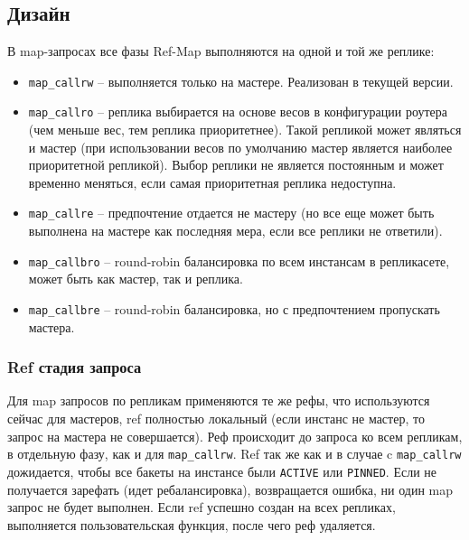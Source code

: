\subsection{Дизайн}

В map-запросах все фазы Ref-Map выполняются на одной и той же реплике:

\begin{itemize}
\item \texttt{map_callrw} -- выполняется только на мастере. Реализован в
    текущей версии.

\item \texttt{map\_callro} -- реплика выбирается на основе весов в конфигурации
    роутера (чем меньше вес, тем реплика приоритетнее). Такой репликой может
        являться и мастер (при использовании весов по умолчанию мастер является
        наиболее приоритетной репликой). Выбор реплики не является постоянным и
        может временно меняться, если самая приоритетная реплика недоступна.

\item \texttt{map\_callre} -- предпочтение отдается не мастеру (но все еще
    может быть выполнена на мастере как последняя мера, если все реплики не
        ответили).

\item \texttt{map\_callbro} -- round-robin балансировка по всем инстансам в
    репликасете, может быть как мастер, так и реплика.

\item \texttt{map\_callbre} -- round-robin балансировка, но с предпочтением
    пропускать мастера.
\end{itemize}

\subsubsection{Ref стадия запроса}

Для map запросов по репликам применяются те же рефы, что используются сейчас
для мастеров, ref полностью локальный (если инстанс не мастер, то запрос на
мастера не совершается). Реф происходит до запроса ко всем репликам, в
отдельную фазу, как и для \texttt{map\_callrw}. Ref так же как и в случае c
\texttt{map\_callrw} дожидается, чтобы все бакеты на инстансе были
\texttt{ACTIVE} или \texttt{PINNED}. Если не получается зарефать (идет
ребалансировка), возвращается ошибка, ни один map запрос не будет выполнен.
Если ref успешно создан на всех репликах, выполняется пользовательская функция,
после чего реф удаляется.

